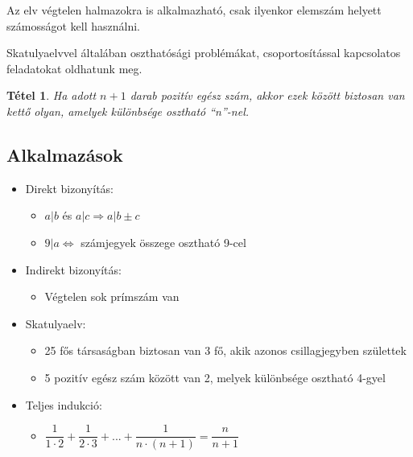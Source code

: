\documentclass[12pt,a4paper]{article}
\newtheorem{theorem}{Tétel} [section]
\begin{document}
Az elv végtelen halmazokra is alkalmazható, csak ilyenkor elemszám helyett számosságot kell használni.

Skatulyaelvvel általában oszthatósági problémákat, csoportosítással kapcsolatos feladatokat oldhatunk meg.

\begin{theorem}
Ha adott $n + 1$ darab pozitív egész szám, akkor ezek között biztosan van kettő olyan, amelyek különbsége osztható ``n''-nel.
\end{theorem}

\subsection{Alkalmazások}
\begin{itemize}
\item Direkt bizonyítás:
\begin{itemize}
\item $a|b$ és $a|c \Rightarrow a|b\pm c$
\item $9|a\Leftrightarrow$ számjegyek összege osztható 9-cel
\end{itemize}
\item Indirekt bizonyítás:
\begin{itemize}
\item Végtelen sok prímszám van
\end{itemize}
\item Skatulyaelv:
\begin{itemize}
\item 25 fős társaságban biztosan van 3 fő, akik azonos csillagjegyben születtek
\item 5 pozitív egész szám között van 2, melyek különbsége osztható 4-gyel
\end{itemize}
\item Teljes indukció:
\begin{itemize}
\item $\dfrac{1}{1\cdot 2}+\dfrac{1}{2\cdot 3}+...+\dfrac{1}{n\cdot (n+1)}=\dfrac{n}{n+1}$
\end{itemize}
\end{itemize}
\end{document}
